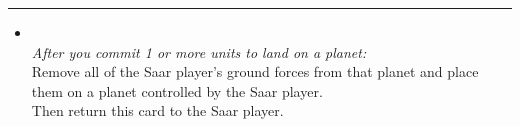 \begin{multicols}{2}
\vspace{-10pt}\rule{\hsize}{0.4pt}\vspace{5pt}


\begin{itemize}
\item {}\\
\emph{After you commit 1 or more units to land on a planet:}\\
Remove all of the Saar player's ground forces from that planet and place them on a planet controlled by the Saar player.\\
Then return this card to the Saar player.
\end{itemize}

\end{multicols}



